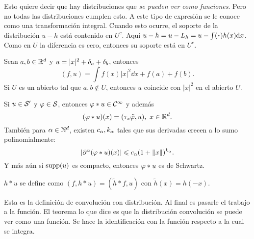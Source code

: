 \documentclass[12pt]{memoir}
\begin{document}
Esto quiere decir que hay distribuciones que \emph{se pueden ver como funciones}. Pero no todas las distribuciones cumplen esto. A este tipo de expresión se le conoce como una transformación integral. Cuando esto ocurre, el soporte de la distribución $u-h$ está contenido en $U^c$. Aquí $u-h=u-L_h=u-\int(\.)h(x)\dd x$. Como en $U$ la diferencia es cero, entonces su soporte está en $U^c$.

\begin{Ex}
  Sean $a,b\in\mathbb{R}^d$ y $u=|x|^2+\delta_a+\delta_b$, entonces 
  $$(f,u)=\int f(x)|x|^2\dd x+f(a)+f(b).$$
  Si $U$ es un abierto tal que $a,b\not\in U$, entonces $u$ coincide con $|x|^2$ en el abierto $U$.
\end{Ex}

\begin{Th}
  Si $u\in\mathcal{S}'$ y $\varphi\in\mathcal{S}$, entonces $\varphi\ast u\in\mathcal{C}^\infty$ y además 
  $$(\vf\ast u)(x)=(\tau_x\tilde{\vf},u),\ x\in\bR^d.$$
  También para $\alpha\in\mathbb{N}^d$, existen $c_\alpha,k_\alpha$ tales que sus derivadas crecen a lo sumo polinomialmente:
  $$|\partial^\alpha(\varphi\ast u)(x)|\leqslant c_\alpha(1+\left\|x\right\|)^{k_\alpha}.$$
  Y más aún si $\operatorname{supp}(u)$ es compacto, entonces $\varphi\ast u$ es de Schwartz.
\end{Th}

\begin{Def}
  $h\ast u$ se define como $(f,h\ast u)=(\tilde{h}\ast f,u)$ con $\tilde{h}(x)=h(-x)$.
\end{Def}

Esta es la definición de convolución con distribución. Al final es pasarle el trabajo a la función. El teorema lo que dice es que la distribución convolución se puede ver como una función. Se hace la identificación con la función respecto a la cual se integra. 
\end{document}
